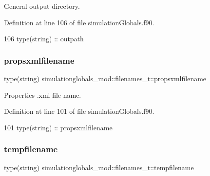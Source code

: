 General output directory. 



Definition at line 106 of file simulation\+Globals.\+f90.


\begin{DoxyCode}
106         \textcolor{keywordtype}{type}(string) :: outpath
\end{DoxyCode}
\mbox{\label{structsimulationglobals__mod_1_1filenames__t_aa68e6aa970dcc2fb6ef62f5c20373948}} 
\subsubsection{\texorpdfstring{propsxmlfilename}{propsxmlfilename}}
{\footnotesize\ttfamily type(string) simulationglobals\+\_\+mod\+::filenames\+\_\+t\+::propsxmlfilename\hspace{0.3cm}{\ttfamily [private]}}



Properties .xml file name. 



Definition at line 101 of file simulation\+Globals.\+f90.


\begin{DoxyCode}
101         \textcolor{keywordtype}{type}(string) :: propsxmlfilename
\end{DoxyCode}
\mbox{\label{structsimulationglobals__mod_1_1filenames__t_a65117f3cf40366162812c184decc8298}} 
\subsubsection{\texorpdfstring{tempfilename}{tempfilename}}
{\footnotesize\ttfamily type(string) simulationglobals\+\_\+mod\+::filenames\+\_\+t\+::tempfilename\hspace{0.3cm}{\ttfamily [private]}}



